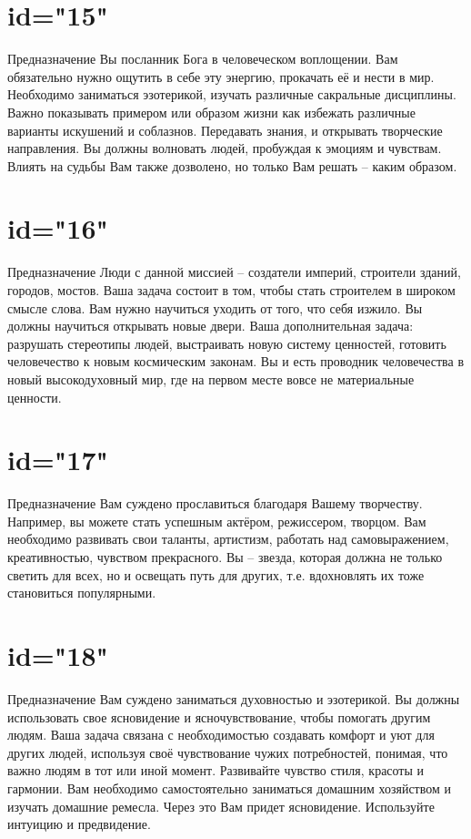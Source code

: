 \section{id="15"}{Предназначение}
Вы посланник Бога в человеческом воплощении. Вам обязательно 
нужно ощутить в себе эту энергию, прокачать её и нести в мир.
Необходимо заниматься эзотерикой, изучать различные сакральные 
дисциплины.
Важно показывать примером или образом жизни как избежать 
различные варианты искушений и соблазнов.
Передавать знания, и открывать творческие направления.
Вы должны волновать людей, пробуждая к эмоциям и чувствам.
Влиять на судьбы Вам также дозволено, но только Вам решать – 
каким образом.
\endsection

\section{id="16"}{Предназначение}
Люди с данной миссией – создатели империй, строители зданий, 
городов, мостов.
Ваша задача состоит в том, чтобы стать строителем в широком 
смысле слова. Вам нужно научиться уходить от того, что себя 
изжило. Вы должны научиться открывать новые двери.
Ваша дополнительная задача: разрушать стереотипы людей, 
выстраивать новую систему ценностей, готовить человечество 
к новым космическим законам. Вы и есть проводник человечества 
в новый высокодуховный мир, где на первом месте вовсе не 
материальные ценности.
\endsection

\section{id="17"}{Предназначение}
Вам суждено прославиться благодаря Вашему творчеству. 
Например, вы можете стать успешным актёром, режиссером, творцом.
Вам необходимо развивать свои таланты, артистизм, работать 
над самовыражением, креативностью, чувством прекрасного.
Вы – звезда, которая должна не только светить для всех, 
но и освещать путь для других, т.е. вдохновлять их тоже 
становиться популярными.
\endsection

\section{id="18"}{Предназначение}
Вам суждено заниматься духовностью и эзотерикой.
Вы должны использовать свое ясновидение и ясночувствование, 
чтобы помогать другим людям.
Ваша задача связана с необходимостью создавать комфорт и 
уют для других людей, используя своё чувствование чужих 
потребностей, понимая, что важно людям в тот или иной момент. 
Развивайте чувство стиля, красоты и гармонии.
Вам необходимо самостоятельно заниматься домашним хозяйством 
и изучать домашние ремесла. Через это Вам придет ясновидение. 
Используйте интуицию и предвидение.
\endsection

